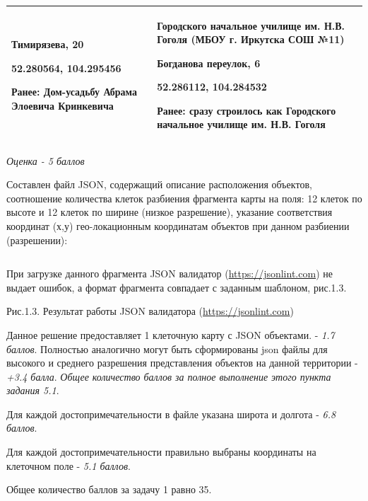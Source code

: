 \begin{longtable}{|p{8cm}|p{8cm}|}
    Тимирязева, 20
    
    52.280564, 104.295456 

    Ранее: Дом-усадьбу Абрама Элоевича Кринкевича & Городского начальное училище им. Н.В. Гоголя (МБОУ г. Иркутска СОШ №11)
    
    Богданова переулок, 6 

    52.286112, 104.284532
    
    Ранее: сразу строилось как Городского начальное училище им. Н.В. Гоголя \\
    \hline    
\end{longtable}

\textit{Оценка - 5 баллов}

Составлен файл JSON, содержащий описание расположения объектов, соотношение количества клеток  разбиения фрагмента карты на поля: 12 клеток по высоте и 12 клеток по ширине (низкое разрешение), указание соответствия координат (х,у) гео-локационным координатам объектов при данном разбиении (разрешении): 

\inputminted[fontsize=\footnotesize, linenos]{json}{final/command_tour/ar/task_01/source.json}

При загрузке данного фрагмента  JSON валидатор (\url{https://jsonlint.com}) не выдает ошибок, а формат 
фрагмента совпадает с заданным шаблоном, рис.1.3.


\begin{center}
    Рис.1.3. Результат работы  JSON валидатора (\url{https://jsonlint.com})
\end{center}

\markSection

Данное решение предоставляет 1 клеточную карту с JSON объектами. - \textit{1.7 баллов}. Полностью аналогично могут быть сформированы json файлы для высокого и среднего разрешения представления объектов на данной территории - \textit{+3.4 балла}. \textit{Общее количество баллов за полное выполнение этого пункта задания 5.1}.

Для каждой достопримечательности в файле указана широта и долгота - \textit{6.8 баллов}.

Для каждой достопримечательности правильно выбраны координаты на клеточном поле - \textit{5.1 баллов}.

Общее количество баллов за задачу 1 равно 35.